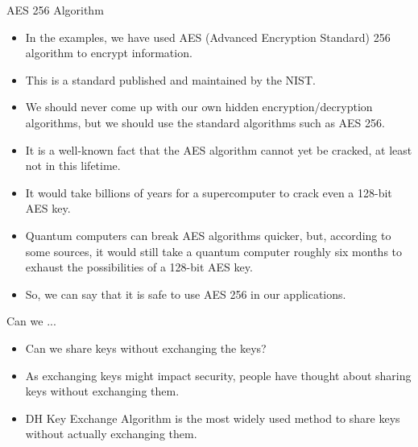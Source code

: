 \begin{frame}[fragile]{AES 256 Algorithm}

\begin{itemize}
	\item In the examples, we have used AES (Advanced Encryption Standard) 256 algorithm to encrypt information. 
	\item This is a standard published and maintained by the NIST. 
	\item We should never come up with our own hidden encryption/decryption algorithms, but we should use the standard algorithms such as AES 256. 
\end{itemize}
\end{frame}

\begin{frame}[fragile]{}

\begin{itemize}
	\item It is a well-known fact that the AES algorithm cannot yet be cracked, at least not in this lifetime. 
	\item It would take billions of years for a supercomputer to crack even a 128-bit AES key. 
	\item Quantum computers can break AES algorithms quicker, but, according to some sources, it would still take a quantum computer roughly six months to exhaust the possibilities of a 128-bit AES key.
	\item So, we can say that it is safe to use AES 256 in our applications. 
\end{itemize}
\end{frame}

\begin{frame}[fragile]{Can we ...}

\begin{itemize}
	\item Can we share keys without exchanging the keys?
	\item As exchanging keys might impact security, people have thought about sharing keys without exchanging them. 
	\item DH Key Exchange Algorithm is the most widely used method to share keys without actually exchanging them. 
\end{itemize}

\end{frame}

